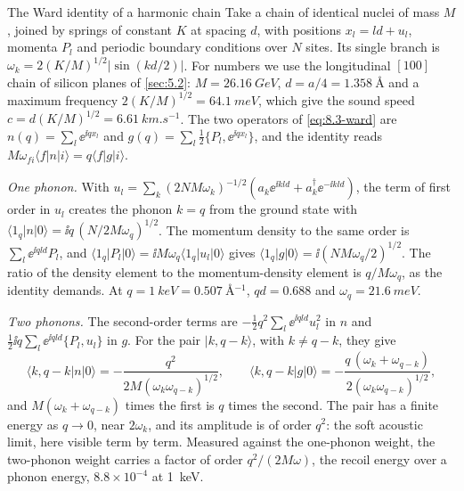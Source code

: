 \begin{workedexample}{The Ward identity of a harmonic chain}\label{we:8-chain}
Take a chain of identical nuclei of mass $M$, joined by springs of constant $K$ at spacing $d$, with positions $x_l = ld + u_l$, momenta $P_l$ and periodic boundary conditions over $N$ sites. Its single branch is $\omega_k = 2(K/M)^{1/2}|\sin(kd/2)|$. For numbers we use the longitudinal $[100]$ chain of silicon planes of \cref{sec:5.2}: $M = \SI{26.16}{GeV}$, $d = a/4 = \SI{1.358}{\angstrom}$ and a maximum frequency $2(K/M)^{1/2} = \SI{64.1}{meV}$, which give the sound speed $c = d(K/M)^{1/2} = \SI{6.61}{km.s^{-1}}$. The two operators of \cref{eq:8.3-ward} are $n(q) = \sum_l\ee^{\ii qx_l}$ and $g(q) = \sum_l\frac12\{P_l, \ee^{\ii qx_l}\}$, and the identity reads $M\omega_{fi}\langle f|n|i\rangle = q\langle f|g|i\rangle$.

\emph{One phonon.} With $u_l = \sum_k(2NM\omega_k)^{-1/2}(a_k\ee^{\ii kld} + a_k^\dagger\ee^{-\ii kld})$, the term of first order in $u_l$ creates the phonon $k = q$ from the ground state with $\langle1_q|n|0\rangle = \ii q\,(N/2M\omega_q)^{1/2}$. The momentum density to the same order is $\sum_l\ee^{\ii qld}P_l$, and $\langle1_q|P_l|0\rangle = \ii M\omega_q\langle1_q|u_l|0\rangle$ gives $\langle1_q|g|0\rangle = \ii(NM\omega_q/2)^{1/2}$. The ratio of the density element to the momentum-density element is $q/M\omega_q$, as the identity demands. At $q = \SI{1}{keV} = \SI{0.507}{\angstrom^{-1}}$, $qd = 0.688$ and $\omega_q = \SI{21.6}{meV}$.

\emph{Two phonons.} The second-order terms are $-\frac12q^2\sum_l\ee^{\ii qld}u_l^2$ in $n$ and $\frac12\ii q\sum_l\ee^{\ii qld}\{P_l, u_l\}$ in $g$. For the pair $|k, q - k\rangle$, with $k \ne q - k$, they give
\begin{equation*}
  \langle k, q - k|n|0\rangle = -\frac{q^2}{2M(\omega_k\omega_{q-k})^{1/2}} , \qquad
  \langle k, q - k|g|0\rangle = -\frac{q\,(\omega_k + \omega_{q-k})}{2(\omega_k\omega_{q-k})^{1/2}} ,
\end{equation*}
and $M(\omega_k + \omega_{q-k})$ times the first is $q$ times the second. The pair has a finite energy as $q \to 0$, near $2\omega_k$, and its amplitude is of order $q^2$: the soft acoustic limit, here visible term by term. Measured against the one-phonon weight, the two-phonon weight carries a factor of order $q^2/(2M\omega)$, the recoil energy over a phonon energy, $8.8\times10^{-4}$ at \SI{1}{keV}.


\end{workedexample}
